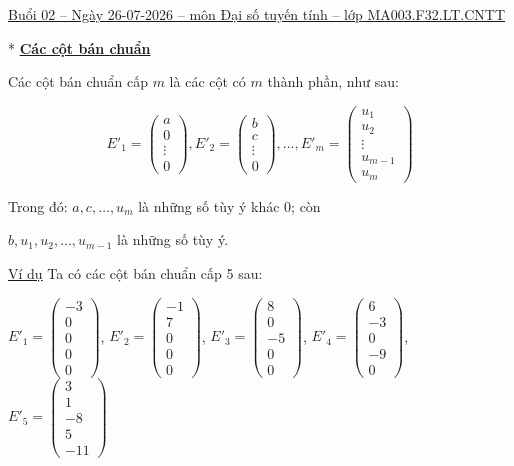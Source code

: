 \documentclass[12pt,a4paper]{article} \usepackage[utf8]{inputenc} \usepackage[T5]{fontenc} \usepackage[vietnamese]{babel} \usepackage{amsmath, amssymb, amsfonts} \usepackage{ulem}
\begin{document}
\ul{Buổi 02 -- Ngày 26-07-2026 -- môn Đại số tuyến tính -- lớp
MA003.F32.LT.CNTT}

* \textbf{\ul{Các cột bán chuẩn}}

Các cột bán chuẩn cấp $m$ là các cột có $m$ thành phần, như sau:

$$
E'_1 = \begin{pmatrix} a \\ 0 \\ \vdots \\ 0 \end{pmatrix}, E'_2 = \begin{pmatrix} b \\ c \\ \vdots \\ 0 \end{pmatrix}, \ldots, E'_m = \begin{pmatrix} u_1 \\ u_2 \\ \vdots \\ u_{m-1} \\ u_m \end{pmatrix}
$$

Trong đó: $a, c, \ldots, u_m$ là những số tùy ý khác 0; còn

$b, u_1, u_2, \ldots, u_{m-1}$ là những số tùy ý.

\ul{Ví dụ} Ta có các cột bán chuẩn cấp 5 sau:

$E'_1 = \begin{pmatrix} -3 \\ 0 \\ 0 \\ 0 \\ 0 \end{pmatrix}$, $E'_2 = \begin{pmatrix} -1 \\ 7 \\ 0 \\ 0 \\ 0 \end{pmatrix}$, $E'_3 = \begin{pmatrix} 8 \\ 0 \\ -5 \\ 0 \\ 0 \end{pmatrix}$, $E'_4 = \begin{pmatrix} 6 \\ -3 \\ 0 \\ -9 \\ 0 \end{pmatrix}$, $E'_5 = \begin{pmatrix} 3 \\ 1 \\ -8 \\ 5 \\ -11 \end{pmatrix}$
\end{document}
